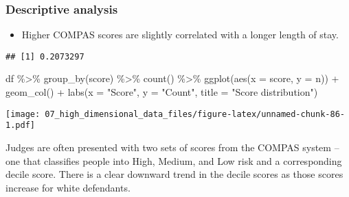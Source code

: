 \documentclass[
]{book}
\newenvironment{Shaded}{\begin{snugshade}}{\end{snugshade}}
\newcommand{\AttributeTok}[1]{\textcolor[rgb]{0.77,0.63,0.00}{#1}}
\newcommand{\FunctionTok}[1]{\textcolor[rgb]{0.00,0.00,0.00}{#1}}
\newcommand{\NormalTok}[1]{#1}
\newcommand{\SpecialCharTok}[1]{\textcolor[rgb]{0.00,0.00,0.00}{#1}}
\newcommand{\StringTok}[1]{\textcolor[rgb]{0.31,0.60,0.02}{#1}}
\providecommand{\tightlist}{%
  \setlength{\itemsep}{0pt}\setlength{\parskip}{0pt}}
\begin{document}
\hypertarget{descriptive-analysis}{%
\subsubsection{Descriptive analysis}\label{descriptive-analysis}}

\begin{itemize}
\tightlist
\item
  Higher COMPAS scores are slightly correlated with a longer length of stay.
\end{itemize}

\begin{Shaded}
\end{Shaded}

\begin{verbatim}
## [1] 0.2073297
\end{verbatim}

\begin{Shaded}
\begin{Highlighting}[]
\NormalTok{df }\SpecialCharTok{\%\textgreater{}\%}
  \FunctionTok{group\_by}\NormalTok{(score) }\SpecialCharTok{\%\textgreater{}\%}
  \FunctionTok{count}\NormalTok{() }\SpecialCharTok{\%\textgreater{}\%}
  \FunctionTok{ggplot}\NormalTok{(}\FunctionTok{aes}\NormalTok{(}\AttributeTok{x =}\NormalTok{ score, }\AttributeTok{y =}\NormalTok{ n)) }\SpecialCharTok{+}
    \FunctionTok{geom\_col}\NormalTok{() }\SpecialCharTok{+}
    \FunctionTok{labs}\NormalTok{(}\AttributeTok{x =} \StringTok{"Score"}\NormalTok{,}
         \AttributeTok{y =} \StringTok{"Count"}\NormalTok{,}
         \AttributeTok{title =} \StringTok{"Score distribution"}\NormalTok{)}
\end{Highlighting}
\end{Shaded}

\texttt{[image: 07\_high\_dimensional\_data\_files/figure-latex/unnamed-chunk-86-1.pdf]}

Judges are often presented with two sets of scores from the COMPAS system -- one that classifies people into High, Medium, and Low risk and a corresponding decile score. There is a clear downward trend in the decile scores as those scores increase for white defendants.
\end{document}
